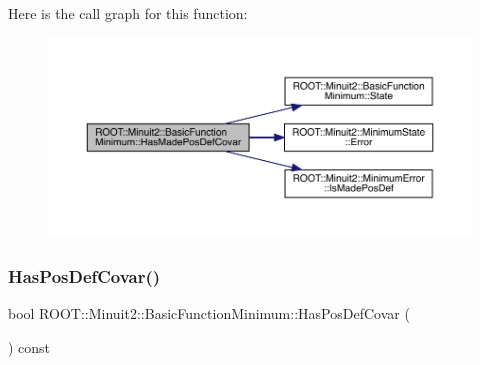 Here is the call graph for this function\+:
\nopagebreak
\begin{figure}[H]
\begin{center}
\leavevmode
\includegraphics[width=350pt]{de/d25/classROOT_1_1Minuit2_1_1BasicFunctionMinimum_a57562fcd9f78a8e4f9a425c8f80f1d83_cgraph}
\end{center}
\end{figure}
\mbox{\label{classROOT_1_1Minuit2_1_1BasicFunctionMinimum_a82e819b720ca93301fdea10fc10af791}} 
\subsubsection{\texorpdfstring{HasPosDefCovar()}{HasPosDefCovar()}\hspace{0.1cm}{\footnotesize\ttfamily [1/3]}}
{\footnotesize\ttfamily bool R\+O\+O\+T\+::\+Minuit2\+::\+Basic\+Function\+Minimum\+::\+Has\+Pos\+Def\+Covar (\begin{DoxyParamCaption}{ }\end{DoxyParamCaption}) const\hspace{0.3cm}{\ttfamily [inline]}}

